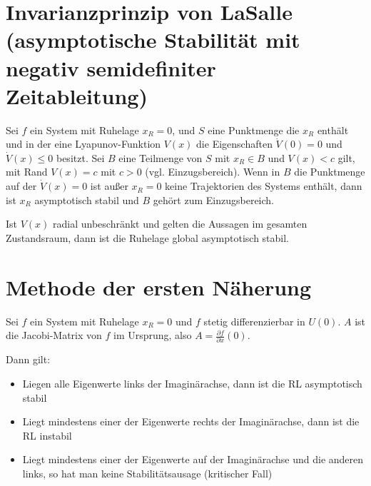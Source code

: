 \section{Invarianzprinzip von LaSalle (asymptotische Stabilität mit negativ semidefiniter Zeitableitung)}
Sei $f$ ein System mit Ruhelage $x_R=0$, und $S$ eine Punktmenge die $x_R$ enthält und in
der eine Lyapunov-Funktion $V(x)$ die Eigenschaften $\dot{V}(0) = 0$ und 
$\dot{V}(x) \leq 0$ besitzt.
Sei $B$ eine Teilmenge von $S$ mit $x_R \in B$ und $V(x) < c$ gilt, mit Rand
$V(x) = c$ mit $c > 0$ (vgl. Einzugsbereich).
Wenn in $B$ die Punktmenge auf der $\dot{V}(x) = 0$ ist außer $x_R=0$ keine Trajektorien
des Systems enthält, dann ist $x_R$ asymptotisch stabil und $B$ gehört zum Einzugsbereich.

Ist $V(x)$ radial unbeschränkt und gelten die Aussagen im gesamten Zustandsraum, dann ist
die Ruhelage global asymptotisch stabil.

\section{Methode der ersten Näherung}
Sei $f$ ein System mit Ruhelage $x_R=0$ und $f$ stetig differenzierbar in $U(0)$.
$A$ ist die Jacobi-Matrix von $f$ im Ursprung, also $A = \frac{\partial f}{\partial x}(0)$.

Dann gilt:
\begin{itemize}
    \item
        Liegen alle Eigenwerte links der Imaginärachse, dann ist die RL asymptotisch stabil
    \item
        Liegt mindestens einer der Eigenwerte rechts der Imaginärachse, dann ist die
        RL instabil
    \item Liegt mindestens einer der Eigenwerte auf der Imaginärachse und die anderen
        links, so hat man keine Stabilitätsausage (kritischer Fall)
\end{itemize}
